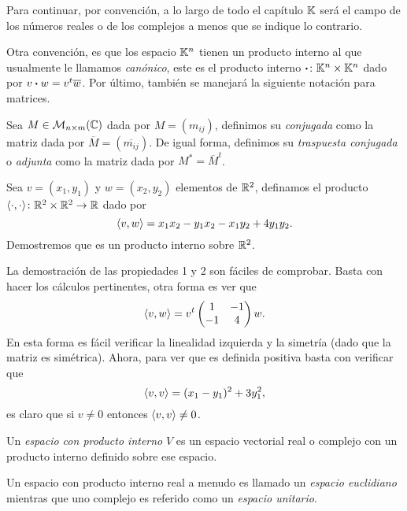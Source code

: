 Para continuar, por convención, a lo largo de todo el capítulo $\mathbb{K}$ será el campo de los números reales o de los complejos a menos que se indique lo contrario.

Otra convención, es que los espacio $\mathbb{K}^n$ tienen un producto interno al que usualmente le llamamos \emph{canónico}, este es el producto interno $\boldsymbol\cdot\colon  \mathbb{K}^n \times \mathbb{K}^n$ dado por $v \boldsymbol\cdot w = v^t \overline{w}$. Por último, también se manejará la siguiente notación para matrices.

\begin{defi}
  Sea $M \in \mathcal{M}_{n\times m}(\mathbb{C})$ dada por $M = (m_{ij})$, definimos su \emph{conjugada} como la matriz dada por $\overline{M} = (\overline{m_{ij}})$. De igual forma, definimos su \emph{traspuesta conjugada} o \emph{adjunta} como la matriz dada por $M^* = \overline{M}^t$.
\end{defi}

\begin{example}
  Sea $v = (x_1, y_1)$ y $w = (x_2, y_2)$ elementos de $\mathbb{R}^2$, definamos el producto $\langle\cdot,\cdot\rangle\colon \mathbb{R}^2 \times \mathbb{R}^2 \to \mathbb{R}$ dado por
    \[ \langle v,w\rangle = x_1 x_2 - y_1x_2 - x_1y_2 + 4y_1y_2. \]
  Demostremos que es un producto interno sobre $\mathbb{R}^2$.

  \examplesolution

  La demostración de las propiedades 1 y 2 son fáciles de comprobar. Basta con hacer los cálculos pertinentes, otra forma es ver que 
    \[
      \langle v,w\rangle = v^t \begin{pmatrix}
        1 & -1 \\ -1 & 4
      \end{pmatrix} w.
    \]
  En esta forma es fácil verificar la linealidad izquierda y la simetría (dado que la matriz es simétrica). Ahora, para ver que es definida positiva basta con verificar que
   \[
     \langle v,v\rangle = (x_1 - y_1)^2 + 3 y_1^2,
   \]
   es claro que si $v \neq 0$ entonces $\langle v,v\rangle \neq 0$.
\end{example}

\begin{defi}
  Un \emph{espacio con producto interno} $V$ es un espacio vectorial real o complejo con un producto interno definido sobre ese espacio.
\end{defi}

Un espacio con producto interno real a menudo es llamado un \emph{espacio euclidiano} mientras que uno complejo es referido como un \emph{espacio unitario}.

